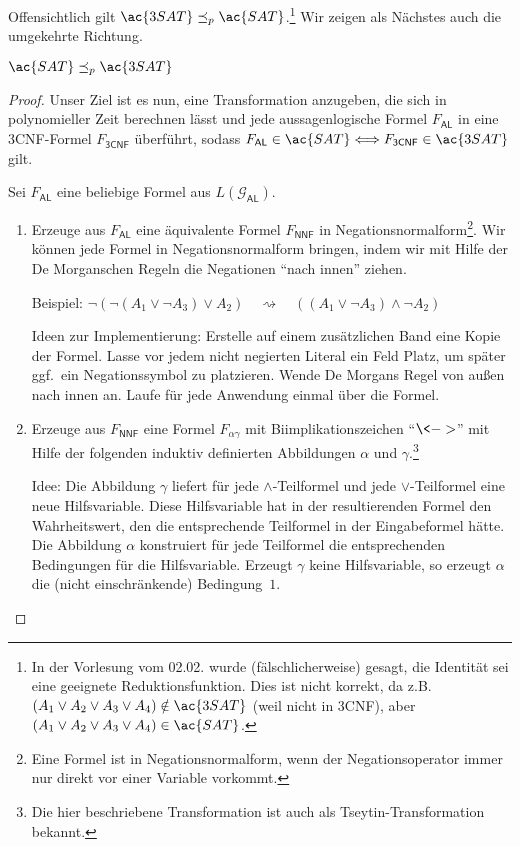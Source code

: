 Offensichtlich gilt $\ac{3SAT} \preceq_p \ac{SAT}$.\footnote{
In der Vorlesung vom 02.02. wurde (fälschlicherweise) gesagt, die Identität sei eine geeignete Reduktionsfunktion.
Dies ist nicht korrekt, da z.B. 
$(A_1\lor A_2\lor A_3\lor A_4)\notin \ac{3SAT}$
(weil nicht in 3CNF), aber $(A_1\lor A_2\lor A_3\lor A_4)\in \ac{SAT}$.
} Wir zeigen als Nächstes auch die umgekehrte Richtung.

\begin{lemma}\label{lem:sat3sat}
	$\ac{SAT} \preceq_p \ac{3SAT}$
\end{lemma}


\begin{proof}
Unser Ziel ist es nun, eine Transformation anzugeben, die sich in polynomieller Zeit berechnen lässt und jede aussagenlogische Formel $F_\mathsf{AL}$ in eine 3CNF-Formel $F_\mathsf{3CNF}$ überführt, sodass
$F_\mathsf{AL}\in \ac{SAT} \<==> F_\mathsf{3CNF}\in \ac{3SAT}$
gilt.

Sei $F_\mathsf{AL}$ eine beliebige Formel aus $L(\mathcal{G}_\mathsf{AL})$.

\begin{enumerate}
 \item Erzeuge aus $F_\mathsf{AL}$ eine äquivalente Formel $F_\mathsf{NNF}$ in Negationsnormalform\footnote{Eine Formel ist in Negationsnormalform, wenn der Negationsoperator immer nur direkt vor einer Variable vorkommt.}.
 Wir können jede Formel in Negationsnormalform bringen, indem wir mit Hilfe der De Morganschen Regeln die Negationen "`nach innen"' ziehen.
 
 Beispiel: $\neg(\neg (A_1\lor \neg A_3)\lor A_2) \quad\rightsquigarrow\quad ((A_1\lor \neg A_3)\land \neg A_2)$
 
 Ideen zur Implementierung: Erstelle auf einem zusätzlichen Band eine Kopie der Formel.
 Lasse vor jedem nicht negierten Literal ein Feld Platz, um später ggf.\ ein Negationssymbol zu platzieren.
 Wende De Morgans Regel von außen nach innen an.
 Laufe für jede Anwendung einmal über die Formel.
 
 
 \item Erzeuge aus $F_\mathsf{NNF}$ eine Formel $F_{\alpha\gamma}$ mit Biimplikationszeichen "`$\<->$"' mit Hilfe der folgenden induktiv definierten Abbildungen $\alpha$ und $\gamma$.\footnote{%
 Die hier beschriebene Transformation ist auch als Tseytin-Transformation bekannt.}
 
 Idee: Die Abbildung $\gamma$ liefert für jede $\land$-Teilformel und jede $\lor$-Teilformel eine neue Hilfsvariable.
 Diese Hilfsvariable hat in der resultierenden Formel den Wahrheitswert, den die entsprechende Teilformel in der Eingabeformel hätte.
 Die Abbildung $\alpha$ konstruiert für jede Teilformel die entsprechenden Bedingungen für die Hilfsvariable.
 Erzeugt $\gamma$ keine Hilfsvariable, so erzeugt $\alpha$ die (nicht einschränkende) Bedingung~$1$.
 

\end{enumerate}
\end{proof}
